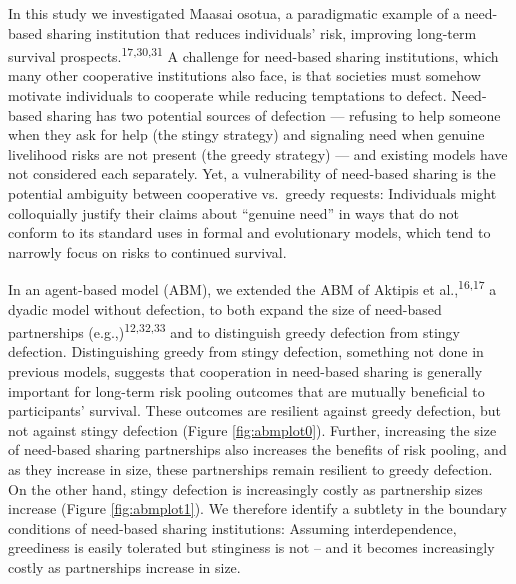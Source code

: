 \documentclass[
]{article}
\begin{document}
In this study we investigated Maasai osotua, a paradigmatic example of a need-based sharing institution that reduces individuals' risk, improving long-term survival prospects.\textsuperscript{17,30,31} A challenge for need-based sharing institutions, which many other cooperative institutions also face, is that societies must somehow motivate individuals to cooperate while reducing temptations to defect. Need-based sharing has two potential sources of defection --- refusing to help someone when they ask for help (the stingy strategy) and signaling need when genuine livelihood risks are not present (the greedy strategy) --- and existing models have not considered each separately. Yet, a vulnerability of need-based sharing is the potential ambiguity between cooperative vs.~greedy requests: Individuals might colloquially justify their claims about ``genuine need'' in ways that do not conform to its standard uses in formal and evolutionary models, which tend to narrowly focus on risks to continued survival.

In an agent-based model (ABM), we extended the ABM of Aktipis et al.,\textsuperscript{16,17} a dyadic model without defection, to both expand the size of need-based partnerships (e.g.,)\textsuperscript{12,32,33} and to distinguish greedy defection from stingy defection. Distinguishing greedy from stingy defection, something not done in previous models, suggests that cooperation in need-based sharing is generally important for long-term risk pooling outcomes that are mutually beneficial to participants' survival. These outcomes are resilient against greedy defection, but not against stingy defection (Figure \ref{fig:abmplot0}). Further, increasing the size of need-based sharing partnerships also increases the benefits of risk pooling, and as they increase in size, these partnerships remain resilient to greedy defection. On the other hand, stingy defection is increasingly costly as partnership sizes increase (Figure \ref{fig:abmplot1}). We therefore identify a subtlety in the boundary conditions of need-based sharing institutions: Assuming interdependence, greediness is easily tolerated but stinginess is not -- and it becomes increasingly costly as partnerships increase in size.
\end{document}
